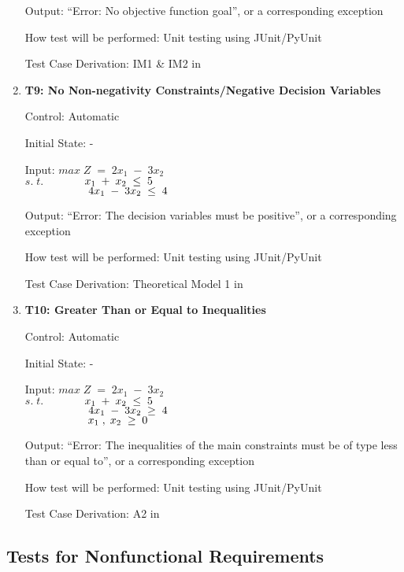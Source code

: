 \documentclass[12pt, titlepage]{article}
\begin{document}
\begin{enumerate}
	Output: ``Error: No objective function goal'', or a corresponding exception
	
	How test will be performed: Unit testing using JUnit/PyUnit
	
	Test Case Derivation: IM1 \& IM2 in \cite{losms-ca}
	
	\item{\textbf{T9: No Non-negativity Constraints/Negative Decision 
	Variables}}
	
	Control: Automatic
	
	Initial State: -
	
	Input: $max\;Z\;=\;2x_1\;-\;3x_2$\\
	$s.\;t.$$\hspace*{1.3cm} x_1\;+\;x_2\; \leq \;5$\\
	$\hspace*{2cm} 4x_1\;-\;3x_2\; \leq \;4$
	
	Output: ``Error: The decision variables must be positive'', or a 
	corresponding exception
	
	How test will be performed: Unit testing using JUnit/PyUnit
	
	Test Case Derivation: Theoretical Model 1 in \cite{losms-ca}
	
	\item{\textbf{T10: Greater Than or Equal to Inequalities}}
	
	Control: Automatic
	
	Initial State: -
	
	Input: $max\;Z\;=\;2x_1\;-\;3x_2$\\
	$s.\;t.$$\hspace*{1.3cm} x_1\;+\;x_2\; \leq \;5$\\
	$\hspace*{2cm} 4x_1\;-\;3x_2\; \geq \;4$\\
	$\hspace*{2cm} x_1\;,\;x_2\; \geq \;0$
	
	Output: ``Error: The inequalities of the main constraints must be of type 
	less than or equal to'', or a corresponding exception
	
	How test will be performed: Unit testing using JUnit/PyUnit
	
	Test Case Derivation: A2 in \cite{losms-ca}
\end{enumerate}

\subsection{Tests for Nonfunctional Requirements}
\end{document}
